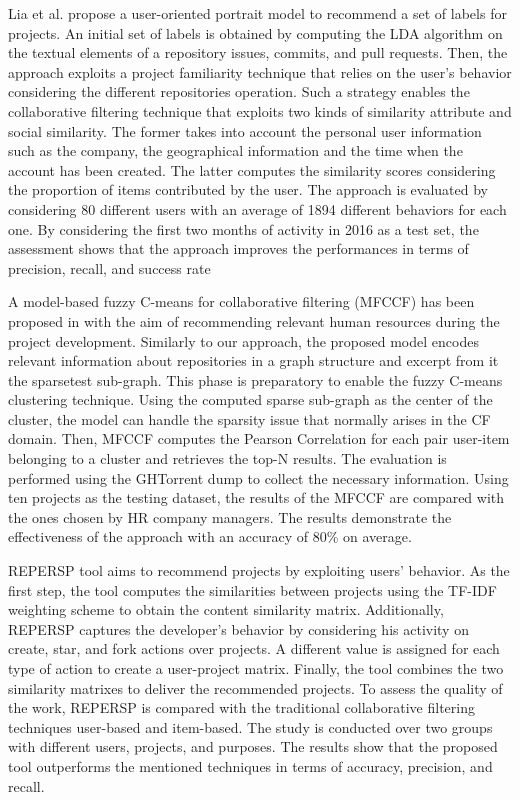 Lia et al. \cite{liao_user_2018} propose a user-oriented portrait model to recommend a set of labels for \GH projects. An initial set of labels is obtained by computing the LDA algorithm on the textual elements of a repository \ie issues, commits, and pull requests. Then, the approach exploits a project familiarity technique that relies on the user's behavior considering the different repositories operation. Such a strategy enables the collaborative filtering technique that exploits two kinds of similarity \ie attribute and social similarity. The former takes into account the personal user information such as the company, the geographical information and the time when the account has been created. The latter computes the similarity scores considering the proportion of items contributed by the user. The approach is evaluated by considering 80 different users with an average of 1894 different behaviors for each one. By considering the first two months of activity in 2016 as a test set, the assessment shows that the approach improves the performances in terms of precision, recall, and success rate


A model-based fuzzy C-means for collaborative filtering (MFCCF) has been proposed in \cite{ajoudanian_recommending_2019} with the aim of recommending relevant human resources during the \GH project development. Similarly to our approach, the proposed model encodes relevant information about repositories in a graph structure and excerpt from it the sparsetest sub-graph. This phase is preparatory to enable the fuzzy C-means clustering technique. Using the computed sparse sub-graph as the center of the cluster, the model can handle the sparsity issue that normally arises in the CF domain. Then, MFCCF computes the Pearson Correlation for each pair user-item belonging to a cluster and retrieves the top-N results. The evaluation is performed using the GHTorrent dump to collect the necessary information. Using ten projects as the testing dataset, the results of the MFCCF are compared with the ones chosen by HR company managers. The results demonstrate the effectiveness of the approach with an accuracy of 80\% on average. 

REPERSP tool \cite{xu_repersp_2017} aims to recommend \GH projects by exploiting users' behavior. As the first step, the tool computes the similarities between projects using the TF-IDF weighting scheme to obtain the content similarity matrix. Additionally, REPERSP captures the developer's behavior by considering his activity on \GH \ie create, star, and fork actions over projects. A different value is assigned for each type of action to create a user-project matrix. Finally, the tool combines the two similarity matrixes to deliver the recommended projects. To assess the quality of the work, REPERSP is compared with the traditional collaborative filtering techniques \ie user-based and item-based. The study is conducted over two groups with different users, projects, and purposes. The results show that the proposed tool outperforms the mentioned techniques in terms of accuracy, precision, and recall. 